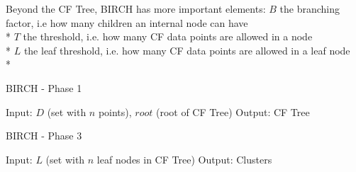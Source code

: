 \documentclass[conference, 10pt]{IEEEtran}
\begin{document}
  Beyond the CF Tree, BIRCH has more important elements:\vspace{1 mm}
  $B$ the branching factor, i.e how many children an internal node can have\\*
  $T$ the threshold, i.e. how many CF data points are allowed in a node\\*
  $L$ the leaf threshold, i.e. how many CF data points are allowed in a leaf node\\*

  \begin{algorithm}
  \caption{BIRCH - Phase 1}
  \begin{algorithmic}[1]
      \State Input: $D$ (set with $n$ points), $root$ (root of CF Tree)
      \State Output: CF Tree
          \Else
        \EndIf
      \EndFor
    \EndProcedure
  \end{algorithmic}
  \end{algorithm}

  \begin{algorithm}
  \caption{BIRCH - Phase 3}
  \begin{algorithmic}[1]
      \State Input: $L$ (set with $n$ leaf nodes in CF Tree)
      \State Output: Clusters
            \EndIf
          \EndFor
        \EndFor
      \EndWhile
    \EndProcedure
  \end{algorithmic}
  \end{algorithm}

\end{document}
